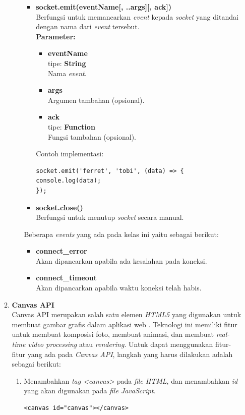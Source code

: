 \documentclass[a4paper,twoside]{article}
\begin{document}
\begin{enumerate}
\begin{enumerate}
\begin{enumerate}
\begin{itemize}
				\item \textbf{socket.emit(eventName[, ..args][, ack])} \\ 
				Berfungsi untuk memancarkan \textit{event} kepada \textit{socket} yang ditandai dengan nama dari \textit{event} tersebut.\\ 
				\textbf{Parameter:}
				\begin{itemize}
					\item \textbf{eventName} \\tipe: \textbf{String} \\ Nama \textit{event}.
					\item \textbf{args} \\ Argumen tambahan (opsional).
					\item \textbf{ack} \\tipe: \textbf{Function} \\ Fungsi tambahan (opsional).
				\end{itemize}
				Contoh implementasi:
\begin{lstlisting}
socket.emit('ferret', 'tobi', (data) => {
console.log(data);
});
\end{lstlisting}
				
				\item \textbf{socket.close()} \\ Berfungsi untuk menutup \textit{socket} secara manual.
			\end{itemize}
			
			Beberapa \textit{events} yang ada pada kelas ini yaitu sebagai berikut:
			\begin{itemize}
				\item \textbf{connect\_error} \\ Akan dipancarkan apabila ada kesalahan pada koneksi.
				\item \textbf{connect\_timeout} \\ Akan dipancarkan apabila waktu koneksi telah habis.
			\end{itemize}
		\end{enumerate} 
		
			
			
			\item \textbf{Canvas API} \\
			Canvas API merupakan salah satu elemen \textit{HTML5} yang digunakan untuk membuat gambar grafis dalam aplikasi web \cite{canvas}. Teknologi ini memiliki fitur untuk membuat komposisi foto, membuat animasi, dan membuat \textit{real-time video processing} atau \textit{rendering}. Untuk dapat menggunakan fitur-fitur yang ada pada \textit{Canvas API}, langkah yang harus dilakukan adalah sebagai berikut:
			\begin{enumerate}
				\item Menambahkan \textit{tag <canvas>} pada \textit{file HTML}, dan menambahkan \textit{id} yang akan digunakan pada \textit{file JavaScript}.
\begin{lstlisting}
<canvas id="canvas"></canvas>
\end{lstlisting}
				

\end{enumerate}
\end{enumerate}
\end{enumerate}
\end{document}
